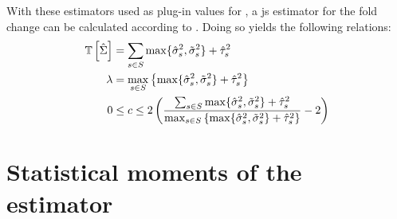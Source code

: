 With these estimators used as plug-in values for , a \gls{js} estimator for the fold change can be calculated according to .
Doing so yields the following relations:
%
\begin{align}
  \mathbb{T} \left[ \hat{\Sigma} \right] & = \sum_{s \in S} \max\{ \hat{\sigma}_s^2, \tilde{\sigma}_s^2 \} + \hat{\tau}_s^2                                                                                                                                      \\
  \lambda              & = \max_{s \in S} \left\{ \max\{ \hat{\sigma}_s^2, \tilde{\sigma}_s^2 \} + \hat{\tau}_s^2 \right\}                                                                                                                     \\
  0                    & \le c \le 2 \left( \frac{\sum_{s \in S} \max\{ \hat{\sigma}_s^2, \tilde{\sigma}_s^2 \} + \hat{\tau}_s^2}{\max_{s \in S} \left\{ \max\{ \hat{\sigma}_s^2, \tilde{\sigma}_s^2 \} + \hat{\tau}_s^2 \right\}} - 2 \right)
  \label{eqn:js_scaling_bounds}
\end{align}
%

\section{Statistical moments of the  estimator}

